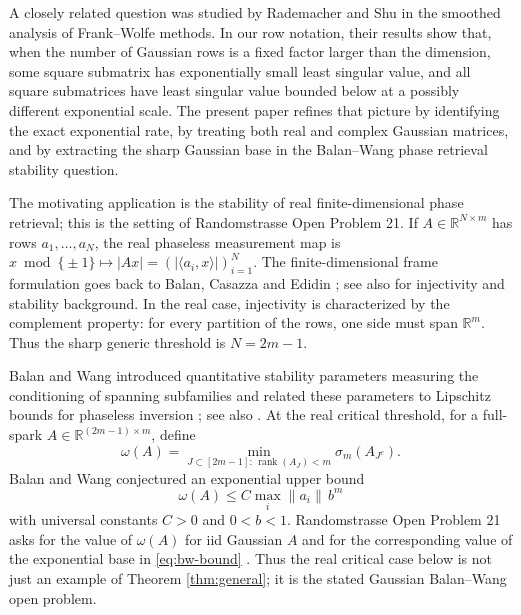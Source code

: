 \documentclass[preprint,12pt]{elsarticle}
\DeclareMathOperator{\rank}{rank}
\newcommand{\R}{\mathbb{R}}
\begin{document}
A closely related question was studied by Rademacher and Shu \cite{RademacherShu2022} in the smoothed
analysis of Frank--Wolfe methods. In our row notation, their results show that, when the number of
Gaussian rows is a fixed factor larger than the dimension, some square submatrix has exponentially
small least singular value, and all square submatrices have least singular value bounded below at a
possibly different exponential scale. The present paper refines that picture by identifying the exact
exponential rate, by treating both real and complex Gaussian matrices, and by extracting the sharp
Gaussian base in the Balan--Wang phase retrieval stability question.

The motivating application is the stability of real finite-dimensional phase retrieval; this is the
setting of Randomstrasse Open Problem 21. If $A\in\R^{N\times m}$ has rows $a_1,\ldots,a_N$, the real
phaseless measurement map is $x\bmod\{\pm1\}\mapsto |Ax|=(|\langle a_i,x\rangle|)_{i=1}^N$. The
finite-dimensional frame formulation goes back to Balan, Casazza and Edidin
\cite{BalanCasazzaEdidin2006}; see also \cite{BandeiraCahillMixonNelson2014,
ConcaEdidinHeringVinzant2015,GrohsKoppensteinerRathmair2020} for injectivity and stability background.
In the real case, injectivity is characterized by the complement property: for every partition of the
rows, one side must span $\R^m$. Thus the sharp generic threshold is $N=2m-1$.

Balan and Wang introduced quantitative stability parameters measuring the conditioning of spanning
subfamilies and related these parameters to Lipschitz bounds for phaseless inversion
\cite{BalanWang2015}; see also \cite{Balan2017,BalanZou2016,EldarMendelson2014}. At the real critical
threshold, for a full-spark $A\in\R^{(2m-1)\times m}$, define
\begin{equation}\label{eq:omega}
  \omega(A)=\min_{J\subset[2m-1]:\,\rank(A_J)<m}\sigma_m(A_{J^c}).
\end{equation}
Balan and Wang conjectured an exponential upper bound
\begin{equation}\label{eq:bw-bound}
  \omega(A)\le C\max_i\|a_i\|\, b^m
\end{equation}
with universal constants $C>0$ and $0<b<1$. Randomstrasse Open Problem 21 asks for the value of
$\omega(A)$ for iid Gaussian $A$ and for the corresponding value of the exponential base in
\eqref{eq:bw-bound} \cite{BandeiraRandomstrasse2025,BandeiraRandomstrasse2026}. Thus the real critical
case below is not just an example of Theorem \ref{thm:general}; it is the stated Gaussian Balan--Wang
open problem.
\end{document}
